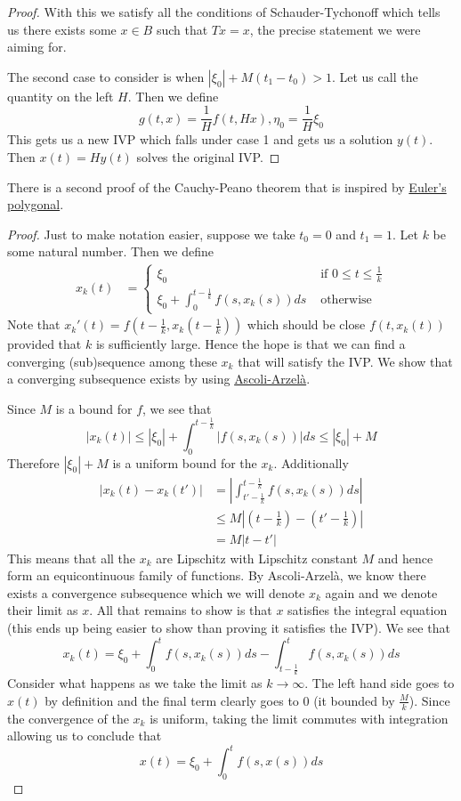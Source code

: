 \begin{proof}
With this we satisfy all the conditions of Schauder-Tychonoff which tells us there exists some $x \in B$ such that $Tx = x$, the precise statement we were aiming for.

The second case to consider is when $|\xi_0| + M(t_1 - t_0) > 1$. Let us call the quantity on the left $H$. Then we define
$$g(t, x) = \frac{1}{H} f(t, Hx), \eta_0 = \frac{1}{H}\xi_0$$
This gets us a new IVP which falls under case 1 and gets us a solution $y(t)$. Then $x(t) = H y(t)$ solves the original IVP.
\end{proof}
There is a second proof of the Cauchy-Peano theorem that is inspired by \href{https://en.wikipedia.org/wiki/Euler_method}{Euler's polygonal}.
\begin{proof}
    Just to make notation easier, suppose we take $t_0 = 0$ and $t_1 = 1$. Let $k$ be some natural number. Then we define
    \begin{align*}
        x_k(t) &=
        \begin{cases}
        \xi_0 &\text{ if } 0 \leq t \leq \frac{1}{k}\\
        \xi_0 + \int_{0}^{t - \frac{1}{k}} f(s, x_k(s)) ds &\text{ otherwise}
        \end{cases}
    \end{align*}
    Note that $x_k'(t) = f(t - \frac{1}{k}, x_k(t - \frac{1}{k}))$ which should be close $f(t, x_k(t))$ provided that $k$ is sufficiently large. Hence the hope is that we can find a converging (sub)sequence among these $x_k$ that will satisfy the IVP. We show that a converging subsequence exists by using \hyperref[thm:ascoli]{Ascoli-Arzelà}.
    
    Since $M$ is a bound for $f$, we see that
    $$ |x_k(t)| \leq |\xi_0| + \int_{0}^{t - \frac{1}{k}} \left| f(s, x_k(s)) \right| ds \leq |\xi_0| + M $$
    Therefore $|\xi_0| + M$ is a uniform bound for the $x_k$. Additionally
    \begin{align*}
        \left| x_k(t) - x_k(t') \right| &= \left| \int_{t' - \frac{1}{k}}^{t - \frac{1}{k}} f(s, x_k(s)) ds \right|\\
        &\leq M \left| \left( t- \frac{1}{k} \right) - \left( t' - \frac{1}{k} \right) \right|\\
        &= M \left| t - t' \right|
    \end{align*}
    This means that all the $x_k$ are Lipschitz with Lipschitz constant $M$ and hence form an equicontinuous family of functions. By Ascoli-Arzelà, we know there exists a convergence subsequence which we will denote $x_k$ again and we denote their limit as $x$. All that remains to show is that $x$ satisfies the integral equation (this ends up being easier to show than proving it satisfies the IVP). We see that
    $$ x_k(t) = \xi_0 + \int_0^t f(s, x_k(s)) ds - \int_{t - \frac{1}{k}}^{t} f(s, x_k(s)) ds $$
    Consider what happens as we take the limit as $k \to \infty$. The left hand side goes to $x(t)$ by definition and the final term clearly goes to 0 (it bounded by $\frac{M}{k}$). Since the convergence of the $x_k$ is uniform, taking the limit commutes with integration allowing us to conclude that
    $$ x(t) = \xi_0 + \int_0^t f(s, x(s)) ds $$
\end{proof}

